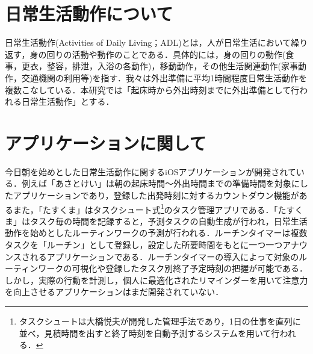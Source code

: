 \section{日常生活動作について}
日常生活動作(Activities of Daily Living；ADL)とは，人が日常生活において繰り返す，身の回りの活動や動作のことである．具体的には，身の回りの動作(食事，更衣，整容，排泄，入浴の各動作)，移動動作，その他生活関連動作(家事動作，交通機関の利用等)を指す\cite{Sakai2003}．我々は外出準備に平均1時間程度日常生活動作を複数こなしている\cite{duhouse}．本研究では「起床時から外出時刻までに外出準備として行われる日常生活動作」とする．

\section{アプリケーションに関して}
今日朝を始めとした日常生活動作に関するiOSアプリケーションが開発されている．例えば「あさとけい」は朝の起床時間〜外出時間までの準備時間を対象にしたアプリケーションであり，登録した出発時刻に対するカウントダウン機能がある\cite{AsaTokei}また，「たすくま」はタスクシュート式\footnote{タスクシュートは大橋悦夫が開発した管理手法であり，1日の仕事を直列に並べ，見積時間を出すと終了時刻を自動予測するシステムを用いて行われる．}のタスク管理アプリである\cite{Taskuma}．「たすくま」はタスク毎の時間を記録すると，予測タスクの自動生成が行われ，日常生活動作を始めとしたルーティンワークの予測が行われる．ルーチンタイマーは複数タスクを「ルーチン」として登録し，設定した所要時間をもとに一つ一つアナウンスされるアプリケーションである\cite{RoutineTimer}．ルーチンタイマーの導入によって対象のルーティンワークの可視化や登録したタスク別終了予定時刻の把握が可能である．しかし，実際の行動を計測し，個人に最適化されたリマインダーを用いて注意力を向上させるアプリケーションはまだ開発されていない．

